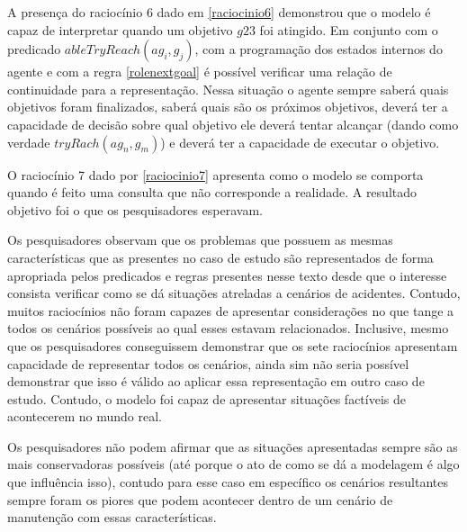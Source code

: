 A presença do raciocínio 6 dado em \ref{raciocinio6} demonstrou que o modelo é capaz de interpretar quando um objetivo $g23$ foi atingido. Em 
conjunto com o predicado $ableTryReach(ag_i,g_j)$, com a programação dos estados internos do agente e com a regra \ref{rolenextgoal} é possível 
verificar uma relação de continuidade para a representação. Nessa situação o agente sempre saberá quais objetivos foram finalizados, saberá 
quais são os próximos objetivos, deverá ter a capacidade de decisão sobre qual objetivo ele deverá tentar alcançar 
(dando como verdade $tryRach(ag_n,g_m)$) e deverá ter a capacidade de executar o objetivo. 

O raciocínio 7 dado por \ref{raciocinio7} apresenta como o modelo se comporta quando é feito uma consulta que não corresponde a realidade. A resultado objetivo foi o que os pesquisadores esperavam. 

Os pesquisadores observam que os problemas que possuem as mesmas características que as presentes no caso de estudo são representados de forma apropriada
pelos predicados e regras presentes nesse texto desde que o interesse consista verificar como se dá situações atreladas a cenários de acidentes. Contudo, 
muitos raciocínios não foram capazes de apresentar considerações no que tange a todos os cenários possíveis ao qual esses estavam relacionados. Inclusive, 
mesmo que os pesquisadores conseguissem demonstrar que os sete raciocínios apresentam capacidade de representar todos os cenários, ainda sim não seria 
possível demonstrar que isso é válido ao aplicar essa representação em outro caso de estudo. Contudo, o modelo foi capaz de apresentar situações factíveis 
de acontecerem no mundo real. 

Os pesquisadores não podem afirmar que as situações apresentadas sempre são as mais conservadoras possíveis (até porque o ato de como se dá a modelagem é algo que influência isso), contudo para esse caso em específico os cenários resultantes sempre foram os piores que podem acontecer dentro de um cenário de manutenção com essas características. 

